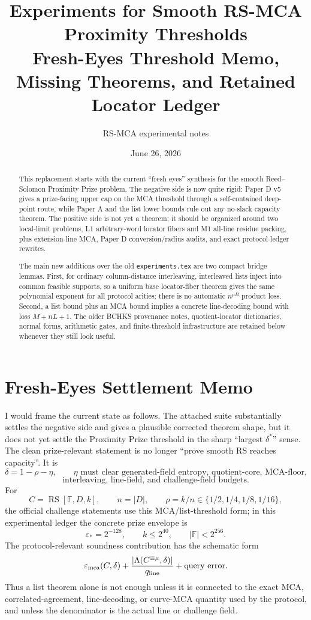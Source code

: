 \documentclass[11pt]{article}
\title{Experiments for Smooth RS-MCA Proximity Thresholds\\
\large Fresh-Eyes Threshold Memo, Missing Theorems, and Retained Locator Ledger}
\author{RS-MCA experimental notes}
\date{June 26, 2026}
\newcommand{\F}{\mathbb F}
\newcommand{\RS}{\operatorname{RS}}
\newcommand{\qline}{q_{\rm line}}
\newcommand{\epsstar}{\varepsilon_*}
\newcommand{\epsmca}{\varepsilon_{\rm mca}}
\newcommand{\Lam}{\Lambda}
\begin{document}
\maketitle

\begin{abstract}
This replacement starts with the current ``fresh eyes'' synthesis for the
smooth Reed--Solomon Proximity Prize problem.  The negative side is now quite
rigid: Paper D v5 gives a prize-facing upper cap on the MCA threshold through a
self-contained deep-point route, while Paper A and the list lower bounds rule
out any no-slack capacity theorem.  The positive side is not yet a theorem; it
should be organized around two local-limit problems, L1 arbitrary-word locator
fibers and M1 all-line residue packing, plus extension-line MCA, Paper D
conversion/radius audits, and exact protocol-ledger rewrites.

The main new additions over the old \texttt{experiments.tex} are two compact
bridge lemmas.  First, for ordinary column-distance interleaving, interleaved
lists inject into common feasible supports, so a uniform base locator-fiber
theorem gives the same polynomial exponent for all protocol arities; there is no
automatic \(n^{\mu B}\) product loss.  Second, a list bound plus an MCA bound
implies a concrete line-decoding bound with loss \(M+nL+1\).  The older BCHKS
provenance notes, quotient-locator dictionaries, normal forms, arithmetic gates,
and finite-threshold infrastructure are retained below whenever they still look
useful.
\end{abstract}

\tableofcontents

\section{Fresh-Eyes Settlement Memo}
\label{sec:fresh-eyes-settlement-memo}

I would frame the current state as follows.  The attached suite substantially
settles the negative side and gives a plausible corrected theorem shape, but it
does not yet settle the Proximity Prize threshold in the sharp ``largest
\(\delta^*\)'' sense.  The clean prize-relevant statement is no longer
``prove smooth RS reaches capacity''.  It is
\[
  \delta=1-\rho-\eta,
  \qquad
  \eta\text{ must clear generated-field entropy, quotient-core, MCA-floor,}
\]
\[
  \text{interleaving, line-field, and challenge-field budgets.}
\]
For
\[
  C=\RS[\F,D,k],\qquad n=|D|,
  \qquad \rho=k/n\in\{1/2,1/4,1/8,1/16\},
\]
the official challenge statements use this MCA/list-threshold form; in this
experimental ledger the concrete prize envelope is~\cite{ProximityPrize26}
\[
  \epsstar=2^{-128},\qquad k\le2^{40},\qquad |\F|<2^{256}.
\]
The protocol-relevant soundness contribution has the schematic form
\[
  \epsmca(C,\delta)
  +\frac{|\Lam(C^{\equiv\mu},\delta)|}{\qline}
  +\text{query error}.
\]
Thus a list theorem alone is not enough unless it is connected to the exact MCA,
correlated-agreement, line-decoding, or curve-MCA quantity used by the protocol,
and unless the denominator is the actual line or challenge field.
\end{document}
